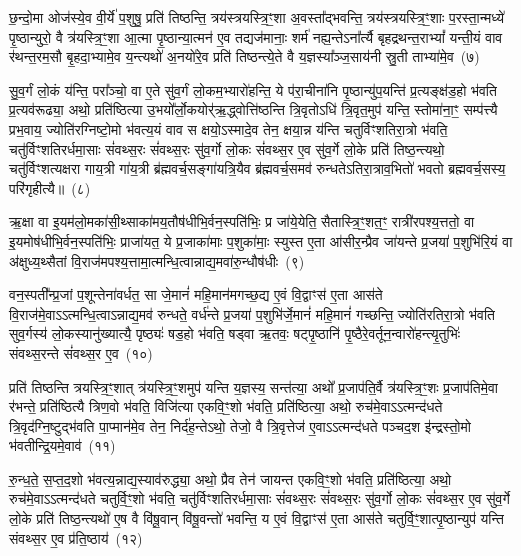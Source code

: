 छ॒न्दो॒मा ओज॑स्ये॒व वी॒र्ये॑ प॒शुषु॒ प्रति॑ तिष्ठन्ति॒ त्रय॑स्त्रयस्त्रि॒ꣳ॒शा अ॒वस्ता᳚द्भवन्ति॒ त्रय॑स्त्रयस्त्रि॒ꣳ॒शाः प॒रस्ता॒न्मध्ये॑ पृ॒ष्ठान्युरो॒ वै त्र॑यस्त्रि॒ꣳ॒शा आ॒त्मा पृ॒ष्ठान्या॒त्मन॑ ए॒व तद्यज॑मानाः॒ शर्म॑ नह्य॒न्ते\-ऽना᳚र्त्यै बृहद्रथन्त॒रा\-भ्यां᳚ यन्ती॒यं वाव र॑थन्त॒रम॒सौ बृ॒हदा॒भ्यामे॒व य॒न्त्यथो॑ अ॒नयो॑रे॒व प्रति॑ तिष्ठन्त्ये॒ते वै य॒ज्ञस्या᳚ञ्ज॒साय॑नी स्रु॒ती ताभ्या॑मे॒व~(७)\ip

सु॒व॒र्गं लो॒कं य॑न्ति॒ परा᳚ञ्चो॒ वा ए॒ते सु॑व॒र्गं लो॒कम॒भ्यारो॑हन्ति॒ ये प॑रा॒चीना॑नि पृ॒ष्ठान्यु॑प॒यन्ति॑ प्र॒त्यङ्क्ष॑ड॒हो भ॑वति प्र॒त्यव॑रूढ्या॒ अथो॒ प्रति॑ष्ठित्या उ॒भयो᳚र्लो॒कयोर्॑\mbox{}ऋ॒द्ध्वोत्ति॑ष्ठन्ति त्रि॒वृतो\-ऽधि॑ त्रि॒वृत॒मुप॑ यन्ति॒ स्तोमा॑ना॒ꣳ॒ सम्प॑त्त्यै प्रभ॒वाय॒ ज्योति॑रग्निष्टो॒मो भ॑वत्य॒यं वाव स क्षयो॒\-ऽस्मादे॒व तेन॒ क्षया॒न्न य॑न्ति चतुर्विꣳशतिरा॒त्रो भ॑वति॒ चतु॑र्विꣳशतिरर्धमा॒साः सं॑वथ्स॒रः सं॑वथ्स॒रः सु॑व॒र्गो लो॒कः सं॑वथ्स॒र ए॒व सु॑व॒र्गे लो॒के प्रति॑ तिष्ठ॒न्त्यथो॒ चतु॑र्विꣳशत्यक्षरा गाय॒त्री गा॑य॒त्री ब्र॑ह्मवर्च॒सङ्गा॑यत्रि॒यैव ब्र॑ह्मवर्च॒समव॑ रुन्धते\-ऽतिरा॒त्राव॒भितो॑ भवतो ब्रह्मवर्च॒सस्य॒ परि॑गृहीत्यै॥~(८)\ip

{\anuvakamend[{म॒नु॒ष्य॑स्य मध्य॒तः प॒शव॒स्ताभ्या॑मे॒व सं॑वथ्स॒रश्चतु॑र्विꣳशतिश्च}]}

ऋ॒क्षा वा इ॒यम॑लो॒मका॑सी॒थ्साका॑मय॒तौष॑धीभि॒र्वन॒स्पति॑भिः॒ प्र जा॑ये॒येति॒ सैतास्त्रि॒ꣳ॒शत॒ꣳ॒ रात्री॑रपश्य॒त्ततो॒ वा इ॒यमोष॑धीभि॒र्वन॒स्पति॑भिः॒ प्राजा॑यत॒ ये प्र॒जाका॑माः प॒शुका॑माः॒ स्युस्त ए॒ता आ॑सीर॒न्प्रैव जा॑यन्ते प्र॒जया॑ प॒शुभि॑रि॒यं वा अ॑क्षुध्य॒थ्सैतां वि॒राज॑मपश्य॒त्तामा॒त्मन्धि॒त्वान्नाद्य॒मवा॑रु॒न्धौष॑धीः~(९)\ip

वन॒स्पती᳚न्प्र॒जां प॒शून्तेना॑वर्धत॒ सा जे॒मानं॑ महि॒मान॑मगच्छ॒द्य ए॒वं वि॒द्वाꣳस॑ ए॒ता आस॑ते वि॒राज॑मे॒वा\-ऽऽ\-त्मन्धि॒त्वा\-ऽन्नाद्य॒मव॑ रुन्धते॒ वर्ध॑न्ते प्र॒जया॑ प॒शुभि॑र्जे॒मानं॑ महि॒मानं॑ गच्छन्ति॒ ज्योति॑रतिरा॒त्रो भ॑वति सुव॒र्गस्य॑ लो॒कस्यानु॑\-ख्यात्यै॒ पृष्ठ्यः॑ षड॒हो भ॑वति॒ षड्वा ऋ॒तवः॒ षट्पृ॒ष्ठानि॑ पृ॒ष्ठैरे॒वर्तून॒न्वारो॑हन्त्यृ॒तुभिः॑ संवथ्स॒रन्ते सं॑वथ्स॒र ए॒व~(१०)\ip

प्रति॑ तिष्ठन्ति त्रयस्त्रि॒ꣳ॒शात् त्र॑यस्त्रि॒ꣳ॒शमुप॑ यन्ति य॒ज्ञस्य॒ सन्त॑त्या॒ अथो᳚ प्र॒जा\-प॑ति॒र्वै त्र॑यस्त्रि॒ꣳ॒शः प्र॒जा\-प॑तिमे॒वा र॑भन्ते॒ प्रति॑ष्ठित्यै त्रिण॒वो भ॑वति॒ विजि॑त्या एकवि॒ꣳ॒शो भ॑वति॒ प्रति॑ष्ठित्या॒ अथो॒ रुच॑मे॒वा\-ऽऽ\-त्मन्द॑धते त्रि॒वृद॑ग्नि॒ष्टुद्भ॑वति पा॒प्मान॑मे॒व तेन॒ निर्द॑ह॒न्ते\-ऽथो॒ तेजो॒ वै त्रि॒वृत्तेज॑ ए॒वा\-ऽऽ\-त्मन्द॑धते पञ्चद॒श इ॑न्द्रस्तो॒मो भ॑वतीन्द्रि॒यमे॒वाव॑~(११)\ip

रु॒न्ध॒ते॒ स॒प्त॒द॒शो भ॑वत्य॒न्नाद्य॒स्याव॑रुद्ध्या॒ अथो॒ प्रैव तेन॑ जायन्त एकवि॒ꣳ॒शो भ॑वति॒ प्रति॑ष्ठित्या॒ अथो॒ रुच॑मे॒वा\-ऽऽ\-त्मन्द॑धते चतुर्वि॒ꣳ॒शो भ॑वति॒ चतु॑र्विꣳशतिरर्धमा॒साः सं॑वथ्स॒रः सं॑वथ्स॒रः सु॑व॒र्गो लो॒कः सं॑वथ्स॒र ए॒व सु॑व॒र्गे लो॒के प्रति॑ तिष्ठ॒न्त्यथो॑ ए॒ष वै वि॑षू॒वान् वि॑षू॒वन्तो॑ भवन्ति॒ य ए॒वं वि॒द्वाꣳस॑ ए॒ता आस॑ते चतुर्वि॒ꣳ॒शात्पृ॒ष्ठान्युप॑ यन्ति संवथ्स॒र ए॒व प्र॑ति॒ष्ठाय॑~(१२)\ip

